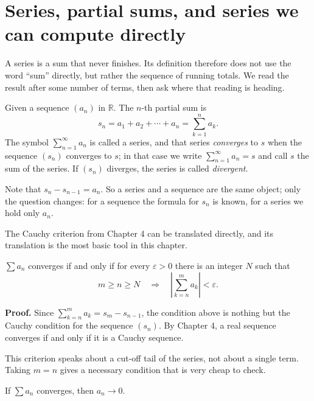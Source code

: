 \section{Series, partial sums, and series we can compute directly}

A series is a sum that never finishes. Its definition therefore does not use
the word ``sum'' directly, but rather the sequence of running totals.
We read the result after some number of terms, then ask where that reading is heading.

\begin{definisi}
Given a sequence $(a_n)$ in $\mathbb{R}$. The $n$-th partial sum is
\[
  s_n = a_1 + a_2 + \cdots + a_n = \sum_{k=1}^{n} a_k .
\]
The symbol $\sum_{n=1}^{\infty} a_n$ is called a series, and that series \emph{converges}
to $s$ when the sequence $(s_n)$ converges to $s$; in that case we write
$\sum_{n=1}^{\infty} a_n = s$ and call $s$ the sum of the series. If $(s_n)$ diverges, the
series is called \emph{divergent}.
\end{definisi}


Note that $s_n - s_{n-1} = a_n$. So a series and a sequence are the same object; only the
question changes: for a sequence the formula for $s_n$ is known, for a series we hold only
$a_n$.

The Cauchy criterion from Chapter 4 can be translated directly, and its translation is the
most basic tool in this chapter.

\begin{teorema}
$\sum a_n$ converges if and only if for every $\varepsilon > 0$ there is an integer $N$
such that
\[
  m \ge n \ge N \quad \Longrightarrow \quad
  \left| \sum_{k=n}^{m} a_k \right| < \varepsilon .
\]
\end{teorema}

\noindent\textbf{Proof.} Since $\sum_{k=n}^{m} a_k = s_m - s_{n-1}$, the condition above is
nothing but the Cauchy condition for the sequence $(s_n)$. By Chapter 4, a real sequence
converges if and only if it is a Cauchy sequence.

This criterion speaks about a cut-off tail of the series, not about a single term. Taking
$m = n$ gives a necessary condition that is very cheap to check.

\begin{akibat}
If $\sum a_n$ converges, then $a_n \to 0$.
\end{akibat}

